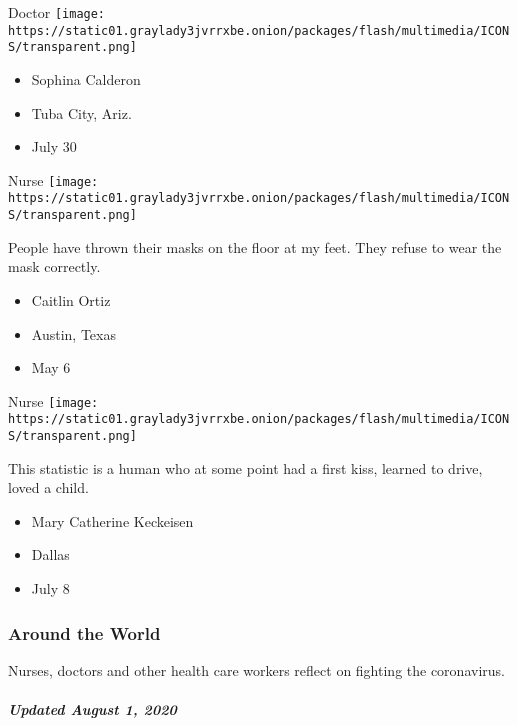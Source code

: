\protect\hyperlink{item-sophina-calderon}{}

Doctor
\texttt{[image: https://static01.graylady3jvrrxbe.onion/packages/flash/multimedia/ICONS/transparent.png]}

\begin{itemize}
\tightlist
\item
  Sophina Calderon
\item
  Tuba City, Ariz.
\item
  July 30
\end{itemize}

\protect\hyperlink{item-caitlin-ortiz}{}

Nurse
\texttt{[image: https://static01.graylady3jvrrxbe.onion/packages/flash/multimedia/ICONS/transparent.png]}

People have thrown their masks on the floor at my feet. They refuse to
wear the mask correctly.

\begin{itemize}
\tightlist
\item
  Caitlin Ortiz
\item
  Austin, Texas
\item
  May 6
\end{itemize}

\protect\hyperlink{item-mary-catherine-keckeisen}{}

Nurse
\texttt{[image: https://static01.graylady3jvrrxbe.onion/packages/flash/multimedia/ICONS/transparent.png]}

This statistic is a human who at some point had a first kiss, learned to
drive, loved a child.

\begin{itemize}
\tightlist
\item
  Mary Catherine Keckeisen
\item
  Dallas
\item
  July 8
\end{itemize}

\hypertarget{around-the-world}{%
\subsubsection{Around the World}\label{around-the-world}}

Nurses, doctors and other health care workers reflect on fighting the
coronavirus.

\hypertarget{updated-august-1-2020-1}{%
\subparagraph{Updated August 1, 2020}\label{updated-august-1-2020-1}}

\protect\hyperlink{item-crescenzo-sala}{}

